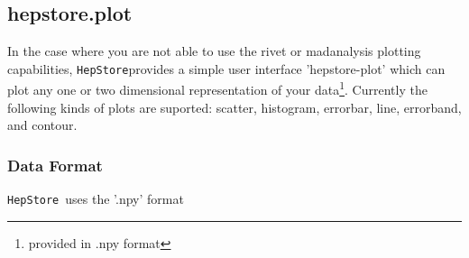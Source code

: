 \documentclass[aps,prd,11pt,tightenlines,superscriptaddress,nofootinbib,preprintnumbers,notitlepage]{revtex4-1}
\newcommand{\hepstore}{\texttt{HepStore}}
\begin{document}
\subsection{hepstore.plot}

In the case where you are not able to use the rivet or madanalysis plotting capabilities, \hepstore provides a simple user interface 'hepstore-plot' which can plot any one or two dimensional representation of your data\footnote{provided in .npy format}. Currently the following kinds of plots are suported: scatter, histogram, errorbar, line, errorband, and contour.

\subsubsection{Data Format}

\hepstore~uses the '.npy' format
\end{document}
